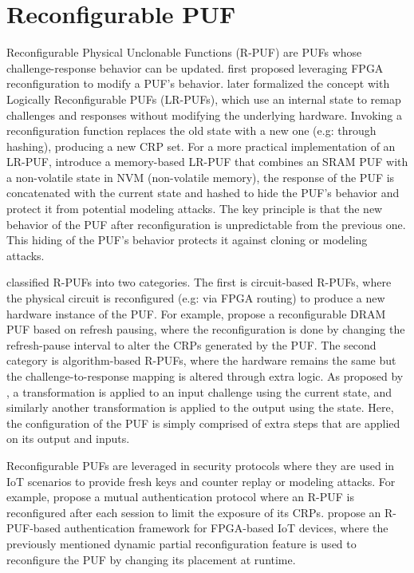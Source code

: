 \section{Reconfigurable PUF}

Reconfigurable Physical Unclonable Functions (R-PUF) are PUFs whose challenge-response behavior can be updated. \cite{10.1145/1502781.1502786} first proposed leveraging FPGA reconfiguration to modify a PUF's behavior. \cite{10.1007/978-3-642-23951-9_25} later formalized the concept with Logically Reconfigurable PUFs (LR-PUFs), which use an internal state to remap challenges and responses without modifying the underlying hardware. Invoking a reconfiguration function replaces the old state with a new one (e.g: through hashing), producing a new CRP set. For a more practical implementation of an LR-PUF, \cite{LR-PUF-Memory-Based} introduce a memory-based LR-PUF that combines an SRAM PUF with a non-volatile state in NVM (non-volatile memory), the response of the PUF is concatenated with the current state and hashed to hide the PUF's behavior and protect it from potential modeling attacks. The key principle is that the new behavior of the PUF after reconfiguration is unpredictable from the previous one. This hiding of the PUF's behavior protects it against cloning or modeling attacks. 

\cite{10.1145/3274666} classified R-PUFs into two categories. The first is circuit-based R-PUFs, where the physical circuit is reconfigured (e.g: via FPGA routing) to produce a new hardware instance of the PUF. For example, \cite{DPUF} propose a reconfigurable DRAM PUF based on refresh pausing, where the reconfiguration is done by changing the refresh-pause interval to alter the CRPs generated by the PUF. The second category is algorithm-based R-PUFs, where the hardware remains the same but the challenge-to-response mapping is altered through extra logic. As proposed by \cite{10.1007/978-3-642-23951-9_25}, a transformation is applied to an input challenge using the current state, and similarly another transformation is applied to the output using the state. Here, the configuration of the PUF is simply comprised of extra steps that are applied on its output and inputs.

Reconfigurable PUFs are leveraged in security protocols where they are used in IoT scenarios to provide fresh keys and counter replay or modeling attacks. For example, \cite{10549865} propose a mutual authentication protocol where an R-PUF is reconfigured after each session to limit the exposure of its CRPs. \cite{s22155577} propose an R-PUF-based authentication framework for FPGA-based IoT devices, where the previously mentioned dynamic partial reconfiguration feature is used to reconfigure the PUF by changing its placement at runtime.

